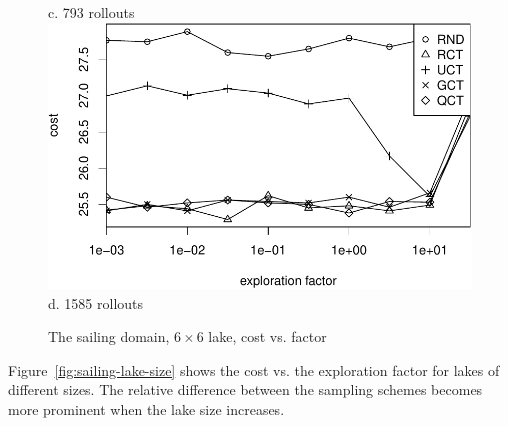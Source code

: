 \documentclass{article}
\begin{document}
\begin{figure}[t]
\begin{minipage}[b]{0.5\linewidth}
    c. 793 rollouts\\
    \vspace{1em}
    \includegraphics[scale=0.45]{costs-size=6-nsamples=1585.pdf}\\
    d. 1585 rollouts\\
  \end{minipage}
  \caption{The sailing domain, $6\times 6$ lake, cost vs. factor}
  \label{fig:sailing-cost-vs-factor}
\end{figure}


Figure~\ref{fig:sailing-lake-size} shows the cost vs. the exploration
factor for lakes of different sizes. The relative difference between
the sampling schemes becomes more prominent when the lake size
increases.
\end{document}
